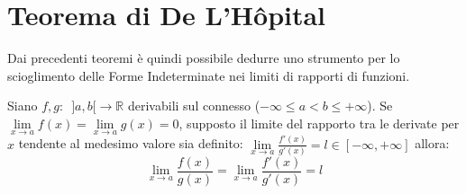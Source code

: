 \documentclass[10pt, oneside]{book}
\theoremstyle{plain}
\begin{document}
\section{Teorema di De L'H\^opital}
Dai precedenti teoremi è quindi possibile dedurre uno strumento per lo scioglimento delle Forme Indeterminate nei limiti di rapporti di funzioni.
\begin{ther}[\textbf{T. di De L'H.}]
Siano $f,g : \enspace ]a, b[ \rightarrow \mathbb{R}$ derivabili sul connesso ($- \infty \leq a < b \leq + \infty$). Se $\lim \limits_{x \rightarrow a} f(x) = \lim \limits_{x \rightarrow a} g(x) = 0$, supposto il limite del rapporto tra le derivate per $x$ tendente al medesimo valore sia definito: $\displaystyle \lim \limits_{x \rightarrow a} \frac{f'(x)}{g'(x)} = l \in [- \infty, + \infty]$ allora:
\[\lim \limits_{x \rightarrow a} \frac{f(x)}{g(x)} = \lim \limits_{x \rightarrow a} \frac{f'(x)}{g'(x)} = l\]
\end{ther}
\end{document}
